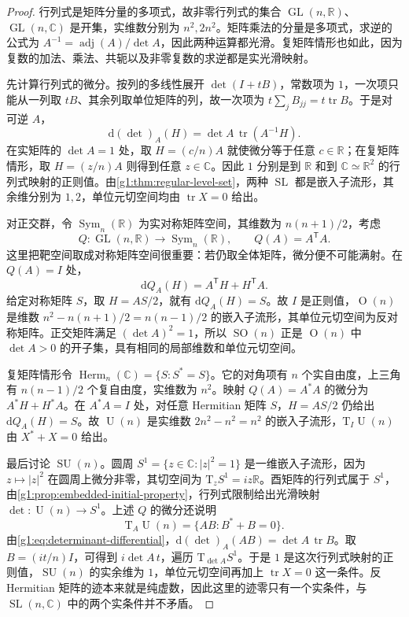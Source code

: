 \begin{proof}
	行列式是矩阵分量的多项式，故非零行列式的集合 \(\operatorname{GL}(n,\mathbb R)\)、\(\operatorname{GL}(n,\mathbb C)\) 是开集，实维数分别为 \(n^2,2n^2\)。矩阵乘法的分量是多项式，求逆的公式为 \(A^{-1}=\operatorname{adj}(A)/\det A\)，因此两种运算都光滑。复矩阵情形也如此，因为复数的加法、乘法、共轭以及非零复数的求逆都是实光滑映射。

	先计算行列式的微分。按列的多线性展开 \(\det(I+tB)\)，常数项为 \(1\)，一次项只能从一列取 \(tB\)、其余列取单位矩阵的列，故一次项为 \(t\sum_jB_{jj}=t\operatorname{tr}B\)。于是对可逆 \(A\)，
	\begin{equation}\label{g1:eq:determinant-differential}
		\mathrm{d}(\det)_A(H)=\det A\,\operatorname{tr}(A^{-1}H).
	\end{equation}
	在实矩阵的 \(\det A=1\) 处，取 \(H=(c/n)A\) 就使微分等于任意 \(c\in\mathbb R\)；在复矩阵情形，取 \(H=(z/n)A\) 则得到任意 \(z\in\mathbb C\)。因此 \(1\) 分别是到 \(\mathbb R\) 和到 \(\mathbb C\simeq\mathbb R^2\) 的行列式映射的正则值。由\cref{g1:thm:regular-level-set}，两种 \(\operatorname{SL}\) 都是嵌入子流形，其余维分别为 \(1,2\)，单位元切空间均由 \(\operatorname{tr}X=0\) 给出。

	对正交群，令 \(\operatorname{Sym}_n(\mathbb R)\) 为实对称矩阵空间，其维数为 \(n(n+1)/2\)，考虑
	\[
		Q:\operatorname{GL}(n,\mathbb R)\longrightarrow\operatorname{Sym}_n(\mathbb R),\qquad Q(A)=A^{\mathsf T}A.
	\]
	这里把靶空间取成对称矩阵空间很重要：若仍取全体矩阵，微分便不可能满射。在 \(Q(A)=I\) 处，
	\[
		\mathrm{d}Q_A(H)=A^{\mathsf T}H+H^{\mathsf T}A.
	\]
	给定对称矩阵 \(S\)，取 \(H=AS/2\)，就有 \(\mathrm{d}Q_A(H)=S\)。故 \(I\) 是正则值，\(\operatorname{O}(n)\) 是维数 \(n^2-n(n+1)/2=n(n-1)/2\) 的嵌入子流形，其单位元切空间为反对称矩阵。正交矩阵满足 \((\det A)^2=1\)，所以 \(\operatorname{SO}(n)\) 正是 \(\operatorname{O}(n)\) 中 \(\det A>0\) 的开子集，具有相同的局部维数和单位元切空间。

	复矩阵情形令 \(\operatorname{Herm}_n(\mathbb C)=\{S:S^*=S\}\)。它的对角项有 \(n\) 个实自由度，上三角有 \(n(n-1)/2\) 个复自由度，实维数为 \(n^2\)。映射 \(Q(A)=A^*A\) 的微分为 \(A^*H+H^*A\)。在 \(A^*A=I\) 处，对任意 Hermitian 矩阵 \(S\)，\(H=AS/2\) 仍给出 \(\mathrm{d}Q_A(H)=S\)。故 \(\operatorname{U}(n)\) 是实维数 \(2n^2-n^2=n^2\) 的嵌入子流形，\(\mathrm{T}_I\operatorname{U}(n)\) 由 \(X^*+X=0\) 给出。

	最后讨论 \(\operatorname{SU}(n)\)。圆周 \(S^1=\{z\in\mathbb C:|z|^2=1\}\) 是一维嵌入子流形，因为 \(z\mapsto|z|^2\) 在圆周上微分非零，其切空间为 \(\mathrm{T}_zS^1=iz\mathbb R\)。酉矩阵的行列式属于 \(S^1\)，由\cref{g1:prop:embedded-initial-property}，行列式限制给出光滑映射 \(\det:\operatorname{U}(n)\to S^1\)。上述 \(Q\) 的微分还说明
	\[
		\mathrm{T}_A\operatorname{U}(n)=\{AB:B^*+B=0\}.
	\]
	由\eqref{g1:eq:determinant-differential}，\(\mathrm{d}(\det)_A(AB)=\det A\,\operatorname{tr}B\)。取 \(B=(it/n)I\)，可得到 \(i\det A\,t\)，遍历 \(\mathrm{T}_{\det A}S^1\)。于是 \(1\) 是这次行列式映射的正则值，\(\operatorname{SU}(n)\) 的实余维为 \(1\)，单位元切空间再加上 \(\operatorname{tr}X=0\) 这一条件。反 Hermitian 矩阵的迹本来就是纯虚数，因此这里的迹零只有一个实条件，与 \(\operatorname{SL}(n,\mathbb C)\) 中的两个实条件并不矛盾。


\end{proof}
